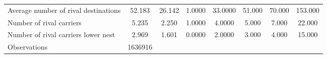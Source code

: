 \begin{table}[htbp]
\begin{tabular}{l*{1}{ccccccc}}
Average number of rival destinations&      52.183&      26.142&      1.0000&     33.0000&      51.000&      70.000&     153.000\\
Number of rival carriers&       5.235&       2.250&      1.0000&      4.0000&       5.000&       7.000&      22.000\\
Number of rival carriers lower nest&       2.969&       1.601&      0.0000&      2.0000&       3.000&       4.000&      15.000\\
\midrule
Observations        &     1636916&            &            &            &            &            &            \\
\bottomrule
\end{tabular}
\end{table}
